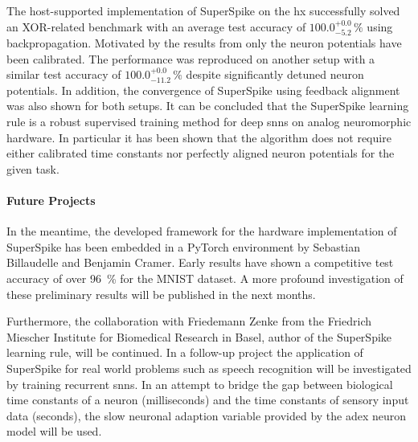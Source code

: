The host-supported implementation of SuperSpike on the \gls{hx} successfully solved an XOR-related benchmark with an average test accuracy of $100.0_{-5.2}^{+0.0}\, \%$ using backpropagation. Motivated by the results from \cite{wunderlich2019advantages} only the neuron potentials have been calibrated. The performance was reproduced on another setup with a similar test accuracy of $100.0_{-11.2}^{+0.0}\, \%$ despite significantly detuned neuron potentials. In addition, the convergence of SuperSpike using feedback alignment was also shown for both setups. It can be concluded that the SuperSpike learning rule is a robust supervised training method for deep \glspl{snn} on analog neuromorphic hardware. In particular it has been shown that the algorithm does not require either calibrated time constants nor perfectly aligned neuron potentials for the given task.
\vspace{-0.2cm}
\paragraph{Future Projects} In the meantime, the developed framework for the hardware implementation of SuperSpike has been embedded in a PyTorch environment by Sebastian Billaudelle and Benjamin Cramer. Early results have shown a competitive test accuracy of over \SI{96}{\%} for the MNIST dataset. A more profound investigation of these preliminary results will be published in the next months.

Furthermore, the collaboration with Friedemann Zenke from the Friedrich Miescher Institute for Biomedical Research in Basel, author of the SuperSpike learning rule, will be continued. In a follow-up project the application of SuperSpike for real world problems such as speech recognition will be investigated by training recurrent \glspl{snn}. In an attempt to bridge the gap between biological time constants of a neuron (milliseconds) and the time constants of sensory input data (seconds), the slow neuronal adaption variable provided by the \gls{adex} neuron model will be used.
\vspace{-0.9cm}